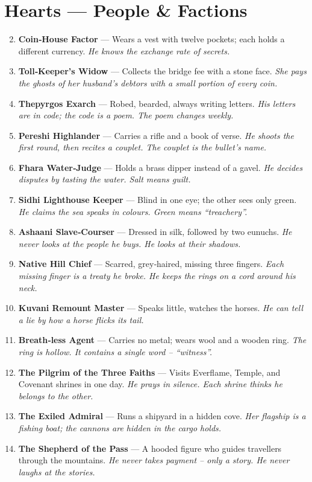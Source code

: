 \documentclass[11pt]{book}
\begin{document}
\section*{Hearts — People \& Factions}
\begin{enumerate}
\setcounter{enumi}{1}
\item \textbf{Coin‑House Factor} — Wears a vest with twelve pockets; each holds a different currency. \textit{He knows the exchange rate of secrets.}
\item \textbf{Toll‑Keeper’s Widow} — Collects the bridge fee with a stone face. \textit{She pays the ghosts of her husband’s debtors with a small portion of every coin.}
\item \textbf{Thepyrgos Exarch} — Robed, bearded, always writing letters. \textit{His letters are in code; the code is a poem. The poem changes weekly.}
\item \textbf{Pereshi Highlander} — Carries a rifle and a book of verse. \textit{He shoots the first round, then recites a couplet. The couplet is the bullet’s name.}
\item \textbf{Fhara Water‑Judge} — Holds a brass dipper instead of a gavel. \textit{He decides disputes by tasting the water. Salt means guilt.}
\item \textbf{Sidhi Lighthouse Keeper} — Blind in one eye; the other sees only green. \textit{He claims the sea speaks in colours. Green means “treachery”.}
\item \textbf{Ashaani Slave‑Courser} — Dressed in silk, followed by two eunuchs. \textit{He never looks at the people he buys. He looks at their shadows.}
\item \textbf{Native Hill Chief} — Scarred, grey‑haired, missing three fingers. \textit{Each missing finger is a treaty he broke. He keeps the rings on a cord around his neck.}
\item \textbf{Kuvani Remount Master} — Speaks little, watches the horses. \textit{He can tell a lie by how a horse flicks its tail.}
\item[J] \textbf{Breath‑less Agent} — Carries no metal; wears wool and a wooden ring. \textit{The ring is hollow. It contains a single word – “witness”.}
\item[Q] \textbf{The Pilgrim of the Three Faiths} — Visits Everflame, Temple, and Covenant shrines in one day. \textit{He prays in silence. Each shrine thinks he belongs to the other.}
\item[K] \textbf{The Exiled Admiral} — Runs a shipyard in a hidden cove. \textit{Her flagship is a fishing boat; the cannons are hidden in the cargo holds.}
\item[A] \textbf{The Shepherd of the Pass} — A hooded figure who guides travellers through the mountains. \textit{He never takes payment – only a story. He never laughs at the stories.}
\end{enumerate}
\end{document}
